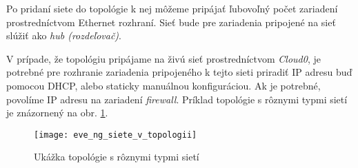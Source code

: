 Po pridaní siete do topológie k nej môžeme pripájať ľubovoľný počet zariadení prostredníctvom Ethernet rozhraní. Sieť bude pre zariadenia pripojené na sieť slúžiť ako \emph{hub (rozdeľovač)}.

V prípade, že topológiu pripájame na živú sieť prostredníctvom \emph{Cloud0}, je potrebné pre rozhranie zariadenia pripojeného k tejto sieti priradiť IP adresu buď pomocou DHCP, alebo staticky manuálnou konfiguráciou. Ak je potrebné, povolíme IP adresu na zariadení \emph{firewall}. Príklad topológie s rôznymi typmi sietí je znázornený na obr. \ref{obr:eve_ng_siete_v_topologii}.

\begin{figure}
    \centering
    \texttt{[image: eve\_ng\_siete\_v\_topologii]}
    \caption{Ukážka topológie s rôznymi typmi sietí}
    \label{obr:eve_ng_siete_v_topologii}
\end{figure}